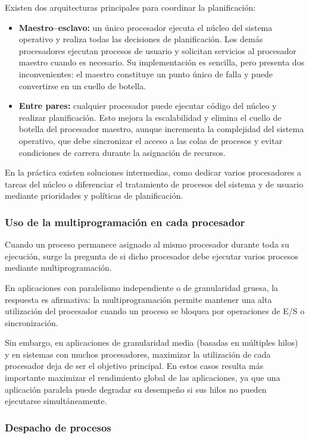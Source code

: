 Existen dos arquitecturas principales para coordinar la planificación:
\begin{itemize}
  \item \textbf{Maestro--esclavo:} un único procesador ejecuta el núcleo del sistema operativo y realiza todas las decisiones de planificación. Los demás procesadores ejecutan procesos de usuario y solicitan servicios al procesador maestro cuando es necesario. Su implementación es sencilla, pero presenta dos inconvenientes: el maestro constituye un punto único de falla y puede convertirse en un cuello de botella.
  \item \textbf{Entre pares:} cualquier procesador puede ejecutar código del núcleo y realizar planificación. Esto mejora la escalabilidad y elimina el cuello de botella del procesador maestro, aunque incrementa la complejidad del sistema operativo, que debe sincronizar el acceso a las colas de procesos y evitar condiciones de carrera durante la asignación de recursos.
\end{itemize}

En la práctica existen soluciones intermedias, como dedicar varios procesadores a tareas del núcleo o diferenciar el tratamiento de procesos del sistema y de usuario mediante prioridades y políticas de planificación.

\subsubsection{Uso de la multiprogramación en cada procesador}

Cuando un proceso permanece asignado al mismo procesador durante toda su ejecución, surge la pregunta de si dicho procesador debe ejecutar varios procesos mediante multiprogramación.

En aplicaciones con paralelismo independiente o de granularidad gruesa, la respuesta es afirmativa: la multiprogramación permite mantener una alta utilización del procesador cuando un proceso se bloquea por operaciones de E/S o sincronización.

Sin embargo, en aplicaciones de granularidad media (basadas en múltiples hilos) y en sistemas con muchos procesadores, maximizar la utilización de cada procesador deja de ser el objetivo principal. En estos casos resulta más importante maximizar el rendimiento global de las aplicaciones, ya que una aplicación paralela puede degradar su desempeño si sus hilos no pueden ejecutarse simultáneamente.

\subsubsection{Despacho de procesos}

